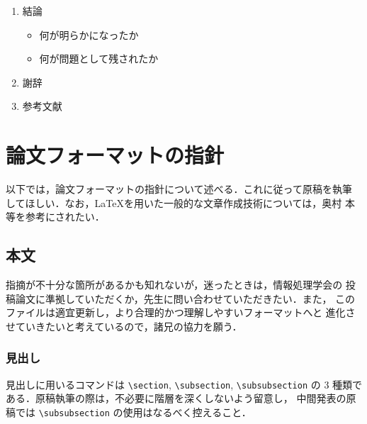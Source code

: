 \documentclass[a4j]{matsushita-zemi}
\begin{document}
\begin{small}
\begin{framed}
\begin{enumerate}
    \item 結論
      \begin{itemize}
      \item 何が明らかになったか
      \item 何が問題として残されたか
      \end{itemize}
      
    \item 謝辞

    \item 参考文献
    \end{enumerate}
  \end{framed}
\end{small}



\section{論文フォーマットの指針}
\label{sec:format}

以下では，論文フォーマットの指針について述べる．これに従って原稿を執筆
してほしい．なお，\LaTeX を用いた一般的な文章作成技術については，奥村
本\cite{okumura} 等を参考にされたい．


\subsection{本文}
指摘が不十分な箇所があるかも知れないが，迷ったときは，情報処理学会の
投稿論文に準拠していただくか，先生に問い合わせていただきたい．また，
このファイルは適宜更新し，より合理的かつ理解しやすいフォーマットへと
進化させていきたいと考えているので，諸兄の協力を願う．


\subsubsection{見出し}

見出しに用いるコマンドは \verb|\section|, \verb|\subsection|, \verb|\subsubsection|
の 3 種類である．原稿執筆の際は，不必要に階層を深くしないよう留意し，
中間発表の原稿では \verb|\subsubsection| の使用はなるべく控えること．
\end{document}
